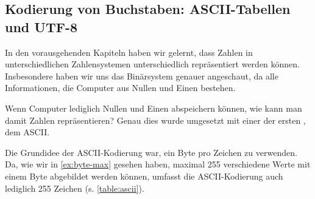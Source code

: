 \subsection{Kodierung von Buchstaben: ASCII-Tabellen und UTF-8}
In den vorausgehenden Kapiteln haben wir gelernt, dass Zahlen in unterschiedlichen Zahlensystemen unterschiedlich repräsentiert werden können. Insbesondere haben wir uns das Binärsystem genauer angeschaut, da alle Informationen, die Computer aus Nullen und Einen bestehen.

Wenn Computer lediglich Nullen und Einen abspeichern können, wie kann man damit Zahlen repräsentieren? Genau dies wurde umgesetzt mit einer der ersten , dem \gls{ASCII}.

Die Grundidee der \gls{ASCII}-Kodierung war, ein Byte pro Zeichen zu verwenden. Da, wie wir in \cref{ex:byte-max} gesehen haben, maximal 255 verschiedene Werte mit einem Byte abgebildet werden können, umfasst die \gls{ASCII}-Kodierung auch lediglich 255 Zeichen (s. \cref{table:ascii}).

